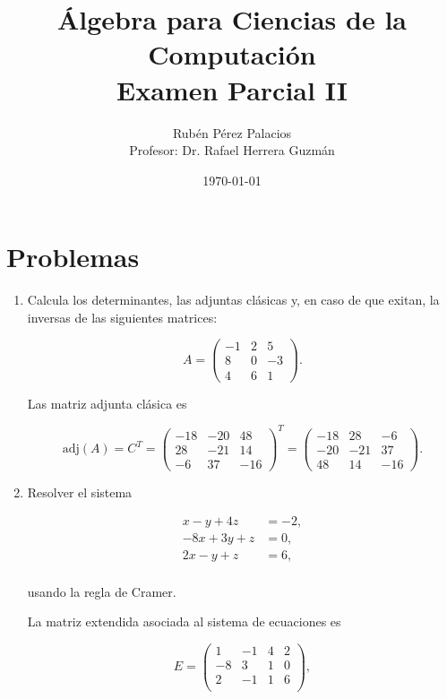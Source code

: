 \documentclass[letterpaper]{article}
\title{Álgebra para Ciencias de la Computación\\Examen Parcial II}
\author{Rubén Pérez Palacios\\Profesor: Dr. Rafael Herrera Guzmán}
\date{\today}
\theoremstyle{definition}
\theoremstyle{lemathm}
\theoremstyle{lemademthm}
\newcommand{\pars}[1]{\left( #1 \right) }
\newcommand{\1}{\mathbbm{1}}
\begin{document}
	\maketitle
    
    \section*{Problemas}

    \begin{enumerate}

		\item Calcula los determinantes, las adjuntas clásicas y, en caso de que exitan, la inversas de las siguientes matrices:
		
		\[A = \begin{pmatrix}
			-1 & 2 & 5\\[1ex]
			8 & 0 & -3\\[1ex]
			4 & 6 & 1
		\end{pmatrix}.\]

		Las matriz adjunta clásica es

		\[\text{adj}(A) = C^T = \begin{pmatrix}
			-18 & -20 & 48\\[1ex]
			28 & -21 & 14\\[1ex]
			-6 & 37 & -16
		\end{pmatrix}^T = \begin{pmatrix}
			-18 & 28 & -6\\[1ex]
			-20 & -21 & 37\\[1ex]
			48 & 14 & -16
		\end{pmatrix}.\]

		\item Resolver el sistema
		
		\begin{align*}
			x-y+4z &= -2,\\
			-8x+3y+z &= 0,\\
			2x-y+z &= 6,\\
		\end{align*}

		usando la regla de Cramer.

		La matriz extendida asociada al sistema de ecuaciones es

		\[E = \pars{\begin{array}{ccc|c}
			1 & -1 & 4 & 2\\[1ex]
			-8 & 3 & 1 & 0\\[1ex]
			2 & -1 & 1 & 6\\
		\end{array}},\]


\end{enumerate}
\end{document}
